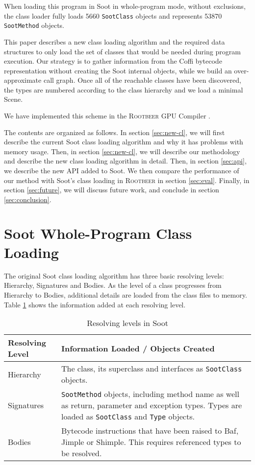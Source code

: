 \documentclass[preprint]{sigplanconf}
\begin{document}
When loading this program in Soot in whole-program mode, without exclusions, the class loader fully loads 5660 \texttt{SootClass} objects and represents 53870 \texttt{SootMethod} objects. %

This paper describes a new class loading algorithm and the required data structures to only load the set of classes that would be needed during program execution. Our strategy is to gather information from the Coffi bytecode representation without creating the Soot internal objects, while we build an over-approximate call graph. Once all of the reachable classes have been discovered, the types are numbered according to the class hierarchy and we load a minimal Scene.

We have implemented this scheme in the \textsc{Rootbeer} GPU Compiler \cite{rootbeer}. 

The contents are organized as follows. In section \ref{sec:new-cl}, we will first describe the current Soot class loading algorithm and why it has problems with memory usage. Then, in section \ref{sec:new-cl}, we will describe our methodology and describe the new class loading algorithm in detail. Then, in section \ref{sec:api}, we describe the new API added to Soot. We then compare the performance of our method with Soot's class loading in \textsc{Rootbeer} in section \ref{sec:eval}. Finally, in section \ref{sec:future}, we will discuss future work, and conclude in section \ref{sec:conclusion}.

\section{Soot Whole-Program Class Loading}
\label{sec:soot-cl}

The original Soot class loading algorithm has three basic resolving levels: Hierarchy, Signatures and Bodies. As the level of a class progresses from Hierarchy to Bodies, additional details are loaded from the class files to memory. Table \ref{tbl:resolving_levels} shows the information added at each resolving level. 

\begin{table}
\begin{tabularx}{\columnwidth}{|l|X|}
\hline
\textbf{Resolving Level} & \textbf{Information Loaded / Objects Created} \\\hline
Hierarchy & The class, its superclass and interfaces as {\tt SootClass} objects. \\\hline
Signatures & {\tt SootMethod} objects, including method name as well as return, parameter and exception types. Types are loaded as {\tt SootClass} and {\tt Type} objects. \\\hline
Bodies & Bytecode instructions that have been raised to Baf, Jimple or Shimple. This requires referenced types to be resolved. \\\hline
\end{tabularx}
\caption{Resolving levels in Soot}
\label{tbl:resolving_levels}
\end{table}
\end{document}
